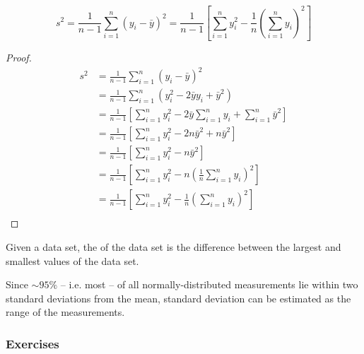\begin{lemm}
    $$s^{2} = \frac{1}{n-1} \sum_{i=1}^{n} (y_{i} - \bar{y})^{2} = \frac{1}{n-1} \left[\sum_{i=1}^{n} y_{i}^{2} - \frac{1}{n} \left(\sum_{i=1}^{n} y_{i}\right)^{2}\right]$$
\end{lemm}

\begin{proof}
    \begin{align*}
        s^{2} &= \frac{1}{n-1} \sum_{i=1}^{n} (y_{i} - \bar{y})^{2}\\
              &= \frac{1}{n-1} \sum_{i=1}^{n} (y_{i}^{2} -2\bar{y} y_{i} + \bar{y}^{2})\\
              &= \frac{1}{n-1} \left[\sum_{i=1}^{n} y_{i}^{2} -2\bar{y} \sum_{i=1}^{n} y_{i} + \sum_{i=1}^{n} \bar{y}^{2}\right]\\
              &= \frac{1}{n-1} \left[\sum_{i=1}^{n} y_{i}^{2} -2n\bar{y}^{2} + n\bar{y}^{2}\right]\\
              &= \frac{1}{n-1} \left[\sum_{i=1}^{n} y_{i}^{2} -n\bar{y}^{2}\right]\\
              &= \frac{1}{n-1} \left[\sum_{i=1}^{n} y_{i}^{2} -n\left(\frac{1}{n} \sum_{i=1}^{n} y_{i}\right)^{2}\right]\\
              &= \frac{1}{n-1} \left[\sum_{i=1}^{n} y_{i}^{2} -\frac{1}{n}\left(\sum_{i=1}^{n} y_{i}\right)^{2}\right]\\    
    \end{align*}
\end{proof}

\begin{defn}
    Given a data set, the  of the data set is the difference between the largest and smallest values of the data set. 
\end{defn}

\begin{note}
    Since $\sim 95\%$ -- i.e. most -- of all normally-distributed measurements lie within two standard deviations from the mean, standard deviation can be estimated as  the range of the measurements.
\end{note}

\subsubsection{Exercises}

